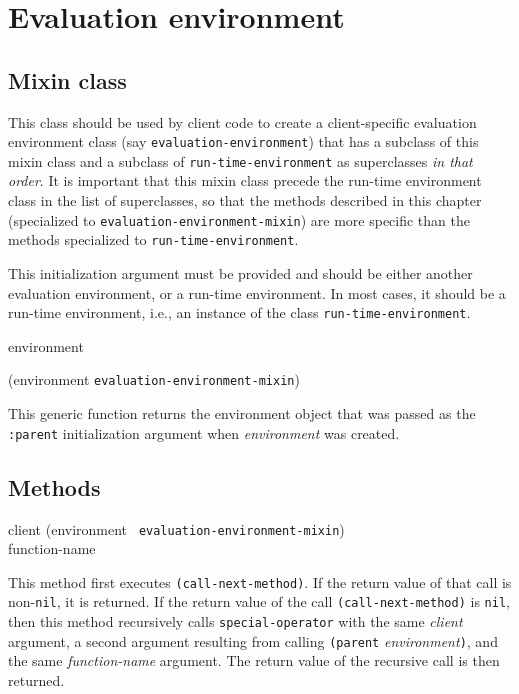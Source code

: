 \chapter{Evaluation environment}

\section{Mixin class}


This class should be used by client code to create a client-specific
evaluation environment class (say \texttt{evaluation-environment})
that has a subclass of this mixin class and a subclass of
\texttt{run-time-environment} as superclasses \emph{in that order}.
It is important that this mixin class precede the run-time environment
class in the list of superclasses, so that the methods described in
this chapter (specialized to \texttt{evaluation-environment-mixin})
are more specific than the methods specialized to
\texttt{run-time-environment}.


This initialization argument must be provided and should be either
another evaluation environment, or a run-time environment.  In most
cases, it should be a run-time environment, i.e., an instance of the
class \texttt{run-time-environment}.

 {environment}

 {(environment {\tt evaluation-environment-mixin})}

This generic function returns the environment object that was passed
as the \texttt{:parent} initialization argument when
\textit{environment} was created.

\section{Methods}

{\small{} {client (environment {\tt
      evaluation-environment-mixin}) \\ function-name}
}

This method first executes \texttt{(call-next-method)}.  If the return
value of that call is non-\texttt{nil}, it is returned.  If the return
value of the call \texttt{(call-next-method)} is \texttt{nil}, then
this method recursively calls \texttt{special-operator} with the same
\textit{client} argument, a second argument resulting from calling
\texttt{(parent} \textit{environment}\texttt{)}, and the same
\textit{function-name} argument.  The return value of the recursive
call is then returned.

